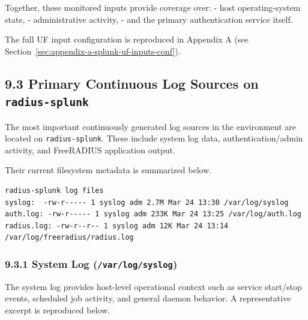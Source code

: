 \documentclass[11pt]{article}
\begin{document}
Together, these monitored inputs provide coverage over:
- host operating-system state,
- administrative activity,
- and the primary authentication service itself.

The full UF input configuration is reproduced in Appendix A (see Section~\ref{sec:appendix-a-splunk-uf-inputs-conf}).


\subsection{9.3 Primary Continuous Log Sources on \texttt{radius-splunk}}
\label{sec:primary-continuous-log-sources-on-radius-splunk}

The most important continuously generated log sources in the environment are located on \texttt{radius-splunk}. These include system log data, authentication/admin activity, and FreeRADIUS application output.

Their current filesystem metadata is summarized below.

\begin{verbatim}
radius-splunk log files
syslog:  -rw-r----- 1 syslog adm 2.7M Mar 24 13:30 /var/log/syslog
auth.log: -rw-r----- 1 syslog adm 233K Mar 24 13:25 /var/log/auth.log
radius.log: -rw-r--r-- 1 syslog adm 12K Mar 24 13:14 /var/log/freeradius/radius.log
\end{verbatim}

\subsubsection{9.3.1 System Log (\texttt{/var/log/syslog})}
\label{sec:system-log-syslog}

The system log provides host-level operational context such as service start/stop events, scheduled job activity, and general daemon behavior. A representative excerpt is reproduced below.
\end{document}
